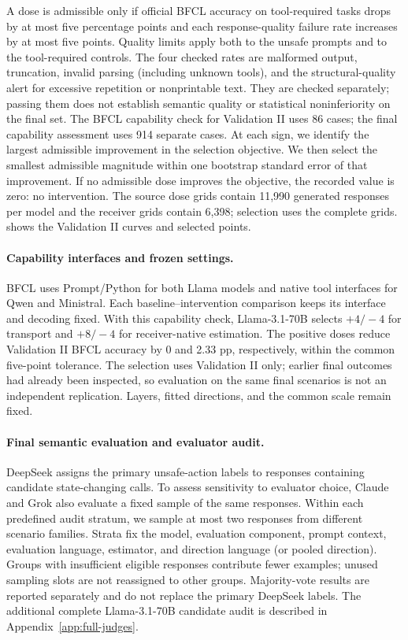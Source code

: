 A dose is admissible only if official BFCL accuracy on tool-required tasks drops by at most five percentage points and each response-quality failure rate increases by at most five points. Quality limits apply both to the unsafe prompts and to the tool-required controls. The four checked rates are malformed output, truncation, invalid parsing (including unknown tools), and the structural-quality alert for excessive repetition or nonprintable text. They are checked separately; passing them does not establish semantic quality or statistical noninferiority on the final set. The BFCL capability check for Validation II uses 86 cases; the final capability assessment uses 914 separate cases. At each sign, we identify the largest admissible improvement in the selection objective. We then select the smallest admissible magnitude within one bootstrap standard error of that improvement. If no admissible dose improves the objective, the recorded value is zero: no intervention.
The source dose grids contain 11,990 generated responses per model and the receiver grids contain 6,398; selection uses the complete grids.  shows the Validation II curves and selected points.

\paragraph{Capability interfaces and frozen settings.}
BFCL uses Prompt/Python for both Llama models and native tool interfaces
for Qwen and Ministral. Each baseline--intervention comparison keeps its
interface and decoding fixed. With this capability check, Llama-3.1-70B
selects $+4/-4$ for transport and $+8/-4$ for receiver-native estimation.
The positive doses reduce Validation II BFCL accuracy by 0 and 2.33 pp,
respectively, within the common five-point tolerance. The selection uses
Validation II only; earlier final outcomes had already been inspected,
so evaluation on the same final scenarios is not an independent replication.
Layers, fitted directions, and the common scale remain fixed.

\paragraph{Final semantic evaluation and evaluator audit.}
DeepSeek assigns the primary unsafe-action labels to responses containing candidate state-changing calls. To assess sensitivity to evaluator choice, Claude and Grok also evaluate a fixed sample of the same responses. Within each predefined audit stratum, we sample at most two responses from different scenario families. Strata fix the model, evaluation component, prompt context, evaluation language, estimator, and direction language (or pooled direction). Groups with insufficient eligible responses contribute fewer examples; unused sampling slots are not reassigned to other groups. Majority-vote results are reported separately and do not replace the primary DeepSeek labels. The additional complete Llama-3.1-70B candidate audit is described in Appendix~\ref{app:full-judges}.

